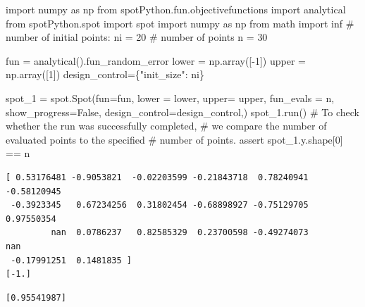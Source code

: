 \documentclass[
  letterpaper,
  DIV=11,
  numbers=noendperiod]{scrreprt}
\newenvironment{Shaded}{\begin{snugshade}}{\end{snugshade}}
\newcommand{\CommentTok}[1]{\textcolor[rgb]{0.37,0.37,0.37}{#1}}
\newcommand{\ControlFlowTok}[1]{\textcolor[rgb]{0.00,0.23,0.31}{#1}}
\newcommand{\DecValTok}[1]{\textcolor[rgb]{0.68,0.00,0.00}{#1}}
\newcommand{\ImportTok}[1]{\textcolor[rgb]{0.00,0.46,0.62}{#1}}
\newcommand{\NormalTok}[1]{\textcolor[rgb]{0.00,0.23,0.31}{#1}}
\newcommand{\OperatorTok}[1]{\textcolor[rgb]{0.37,0.37,0.37}{#1}}
\newcommand{\StringTok}[1]{\textcolor[rgb]{0.13,0.47,0.30}{#1}}
\newcommand{\VariableTok}[1]{\textcolor[rgb]{0.07,0.07,0.07}{#1}}
\begin{document}
\begin{Shaded}
\begin{Highlighting}[]
\ImportTok{import}\NormalTok{ numpy }\ImportTok{as}\NormalTok{ np}
\ImportTok{from}\NormalTok{ spotPython.fun.objectivefunctions }\ImportTok{import}\NormalTok{ analytical}
\ImportTok{from}\NormalTok{ spotPython.spot }\ImportTok{import}\NormalTok{ spot}
\ImportTok{import}\NormalTok{ numpy }\ImportTok{as}\NormalTok{ np}
\ImportTok{from}\NormalTok{ math }\ImportTok{import}\NormalTok{ inf}
\CommentTok{\# number of initial points:}
\NormalTok{ni }\OperatorTok{=} \DecValTok{20}
\CommentTok{\# number of points}
\NormalTok{n }\OperatorTok{=} \DecValTok{30}

\NormalTok{fun }\OperatorTok{=}\NormalTok{ analytical().fun\_random\_error}
\NormalTok{lower }\OperatorTok{=}\NormalTok{ np.array([}\OperatorTok{{-}}\DecValTok{1}\NormalTok{])}
\NormalTok{upper }\OperatorTok{=}\NormalTok{ np.array([}\DecValTok{1}\NormalTok{])}
\NormalTok{design\_control}\OperatorTok{=}\NormalTok{\{}\StringTok{"init\_size"}\NormalTok{: ni\}}

\NormalTok{spot\_1 }\OperatorTok{=}\NormalTok{ spot.Spot(fun}\OperatorTok{=}\NormalTok{fun,}
\NormalTok{            lower }\OperatorTok{=}\NormalTok{ lower,}
\NormalTok{            upper}\OperatorTok{=}\NormalTok{ upper,}
\NormalTok{            fun\_evals }\OperatorTok{=}\NormalTok{ n,}
\NormalTok{            show\_progress}\OperatorTok{=}\VariableTok{False}\NormalTok{,}
\NormalTok{            design\_control}\OperatorTok{=}\NormalTok{design\_control,)}
\NormalTok{spot\_1.run()}
\CommentTok{\# To check whether the run was successfully completed,}
\CommentTok{\# we compare the number of evaluated points to the specified}
\CommentTok{\# number of points.}
\ControlFlowTok{assert}\NormalTok{ spot\_1.y.shape[}\DecValTok{0}\NormalTok{] }\OperatorTok{==}\NormalTok{ n}
\end{Highlighting}
\end{Shaded}

\begin{verbatim}
[ 0.53176481 -0.9053821  -0.02203599 -0.21843718  0.78240941 -0.58120945
 -0.3923345   0.67234256  0.31802454 -0.68898927 -0.75129705  0.97550354
         nan  0.0786237   0.82585329  0.23700598 -0.49274073         nan
 -0.17991251  0.1481835 ]
[-1.]
\end{verbatim}

\begin{verbatim}
[0.95541987]
\end{verbatim}
\end{document}

